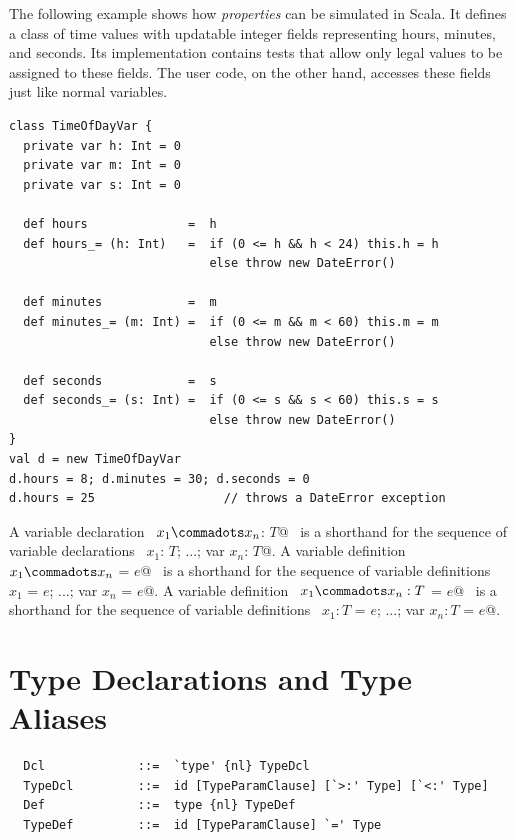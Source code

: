\example The following example shows how {\em properties} can be
simulated in Scala. It defines a class  of time
values with updatable integer fields representing hours, minutes, and
seconds. Its implementation contains tests that allow only legal
values to be assigned to these fields. The user code, on the other
hand, accesses these fields just like normal variables.

\begin{lstlisting}
class TimeOfDayVar {
  private var h: Int = 0 
  private var m: Int = 0 
  private var s: Int = 0 

  def hours              =  h 
  def hours_= (h: Int)   =  if (0 <= h && h < 24) this.h = h 
                            else throw new DateError() 

  def minutes            =  m 
  def minutes_= (m: Int) =  if (0 <= m && m < 60) this.m = m
                            else throw new DateError() 

  def seconds            =  s 
  def seconds_= (s: Int) =  if (0 <= s && s < 60) this.s = s
                            else throw new DateError() 
}
val d = new TimeOfDayVar 
d.hours = 8; d.minutes = 30; d.seconds = 0 
d.hours = 25                  // throws a DateError exception
\end{lstlisting}

A variable declaration ~\lstinline@var $x_1 \commadots x_n$: $T$@~
is a
shorthand for the sequence of variable declarations
~\lstinline@var $x_1$: $T$; ...; var $x_n$: $T$@.
A variable definition ~\lstinline@var $x_1 \commadots x_n$ = $e$@~
is a
shorthand for the sequence of variable definitions
~\lstinline@var $x_1$ = $e$; ...; var $x_n$ = $e$@.
A variable definition ~\lstinline@var $x_1 \commadots x_n: T$ = $e$@~
is a
shorthand for the sequence of variable definitions
~\lstinline@var $x_1: T$ = $e$; ...; var $x_n: T$ = $e$@.

\section{Type Declarations and Type Aliases}
\label{sec:typedcl}
\label{sec:typealias}


\syntax\begin{lstlisting}
  Dcl             ::=  `type' {nl} TypeDcl
  TypeDcl         ::=  id [TypeParamClause] [`>:' Type] [`<:' Type]
  Def             ::=  type {nl} TypeDef
  TypeDef         ::=  id [TypeParamClause] `=' Type
\end{lstlisting}

